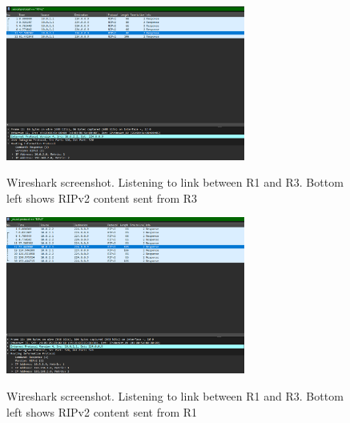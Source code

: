 \documentclass[10pt,a4paper]{ULBreport}
\begin{document}
\begin{figure}[H]
    \caption{Wireshark screenshot. Listening to link between R1 and R3. Bottom left shows RIPv2 content sent from R3}
    \center
    \includegraphics[width=0.7\textwidth]{wiresharkRIPRRR.png}
    \label{riprrr}
\end{figure}

\begin{figure}[H]
    \caption{Wireshark screenshot. Listening to link between R1 and R3. Bottom left shows RIPv2 content sent from R1}
    \center
    \includegraphics[width=0.7\textwidth]{wiresharkRIPRRR_2.png}
    \label{riprrr2}
\end{figure}
\end{document}
